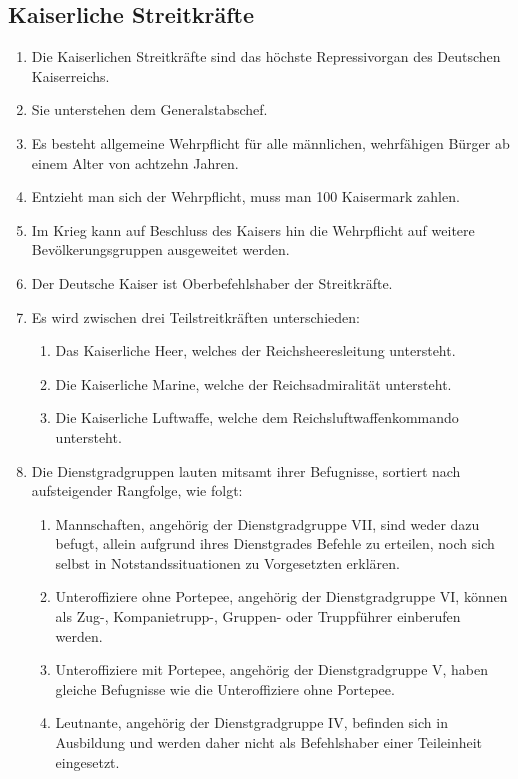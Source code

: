\documentclass{article}
\begin{document}
\subsection{Kaiserliche Streitkräfte}
\begin{enumerate}[(1)]
    \item Die Kaiserlichen Streitkräfte sind das höchste Repressivorgan des Deutschen Kaiserreichs.
    \item Sie unterstehen dem Generalstabschef.
    \item Es besteht allgemeine Wehrpflicht für alle männlichen, wehrfähigen Bürger ab einem Alter von achtzehn Jahren.
    \item Entzieht man sich der Wehrpflicht, muss man 100 Kaisermark zahlen.
    \item Im Krieg kann auf Beschluss des Kaisers hin die Wehrpflicht auf weitere Bevölkerungsgruppen ausgeweitet werden.
    \item Der Deutsche Kaiser ist Oberbefehlshaber der Streitkräfte.
    \item Es wird zwischen drei Teilstreitkräften unterschieden:
    \begin{enumerate}[1.]
        \item Das Kaiserliche Heer, welches der Reichsheeresleitung untersteht.
        \item Die Kaiserliche Marine, welche der Reichsadmiralität untersteht.
        \item Die Kaiserliche Luftwaffe, welche dem Reichsluftwaffenkommando untersteht.
    \end{enumerate}
    \item Die Dienstgradgruppen lauten mitsamt ihrer Befugnisse, sortiert nach aufsteigender Rangfolge, wie folgt:
    \begin{enumerate}[1.]
        \item Mannschaften, angehörig der Dienstgradgruppe VII, sind weder dazu befugt, allein aufgrund ihres Dienstgrades Befehle zu erteilen, noch sich
        selbst in Notstandssituationen zu Vorgesetzten erklären.
        \item Unteroffiziere ohne Portepee, angehörig der Dienstgradgruppe VI, können als Zug-, Kompanietrupp-, 
        Gruppen- oder Truppführer einberufen werden.
        \item Unteroffiziere mit Portepee, angehörig der Dienstgradgruppe V, haben gleiche Befugnisse wie die Unteroffiziere ohne Portepee.
        \item Leutnante, angehörig der Dienstgradgruppe IV, befinden sich in Ausbildung und werden daher nicht als Befehlshaber einer Teileinheit eingesetzt.

\end{enumerate}
\end{enumerate}
\end{document}

